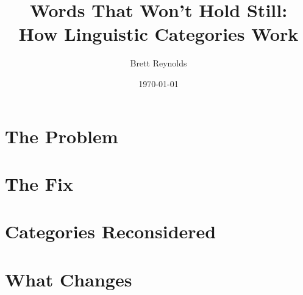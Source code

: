 \documentclass[11pt]{book}
\title{Words That Won't Hold Still: \\ How Linguistic Categories Work}
\author{Brett Reynolds}
\date{\today}
\begin{document}
\frontmatter
\pagestyle{empty}  %



\maketitle
\thispagestyle{empty}  %




\cleardoublepage

\cleardoublepage

\cleardoublepage

\cleardoublepage

\pagestyle{plain}  %
\tableofcontents
\listoffigures

\mainmatter

\part{The Problem}




\part{The Fix}






\part{Categories Reconsidered}







\part{What Changes}







\appendix



\end{document}
